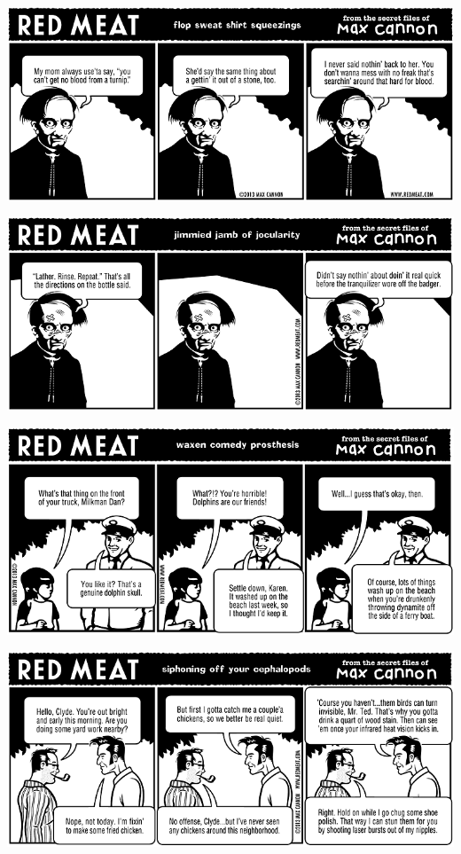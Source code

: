 \documentclass[a4paper,twoside,11pt]{article}
\begin{document}
\includegraphics[width=\textwidth]{redmeat_2013-08-20.png}



\includegraphics[width=\textwidth]{redmeat_2013-08-27.png}



\includegraphics[width=\textwidth]{redmeat_2013-09-03.png}



\includegraphics[width=\textwidth]{redmeat_2013-09-10.png}
\end{document}

